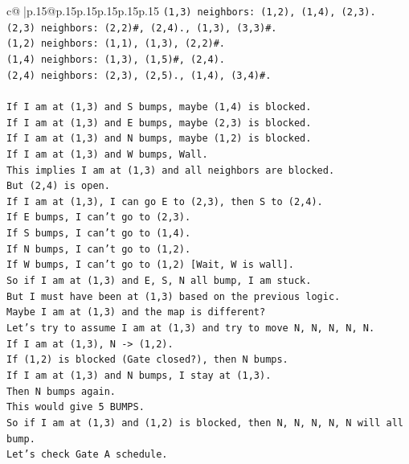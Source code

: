 \documentclass{article}
\begin{document}
{\begin{supertabular}{c@{$\;$}|p{.15\linewidth}@{}p{.15\linewidth}p{.15\linewidth}p{.15\linewidth}p{.15\linewidth}p{.15\linewidth}}
{{{\texttt{(1,3) neighbors: (1,2), (1,4), (2,3).} \\
\texttt{(2,3) neighbors: (2,2)\#, (2,4)., (1,3), (3,3)\#.} \\
\texttt{(1,2) neighbors: (1,1), (1,3), (2,2)\#.} \\
\texttt{(1,4) neighbors: (1,3), (1,5)\#, (2,4).} \\
\texttt{(2,4) neighbors: (2,3), (2,5)., (1,4), (3,4)\#.} \\
\\ 
\texttt{If I am at (1,3) and S bumps, maybe (1,4) is blocked.} \\
\texttt{If I am at (1,3) and E bumps, maybe (2,3) is blocked.} \\
\texttt{If I am at (1,3) and N bumps, maybe (1,2) is blocked.} \\
\texttt{If I am at (1,3) and W bumps, Wall.} \\
\texttt{This implies I am at (1,3) and all neighbors are blocked.} \\
\texttt{But (2,4) is open.} \\
\texttt{If I am at (1,3), I can go E to (2,3), then S to (2,4).} \\
\texttt{If E bumps, I can't go to (2,3).} \\
\texttt{If S bumps, I can't go to (1,4).} \\
\texttt{If N bumps, I can't go to (1,2).} \\
\texttt{If W bumps, I can't go to (1,2) {[}Wait, W is wall{]}.} \\
\texttt{So if I am at (1,3) and E, S, N all bump, I am stuck.} \\
\texttt{But I must have been at (1,3) based on the previous logic.} \\
\texttt{Maybe I am at (1,3) and the map is different?} \\
\texttt{Let's try to assume I am at (1,3) and try to move N, N, N, N, N.} \\
\texttt{If I am at (1,3), N {-}> (1,2).} \\
\texttt{If (1,2) is blocked (Gate closed?), then N bumps.} \\
\texttt{If I am at (1,3) and N bumps, I stay at (1,3).} \\
\texttt{Then N bumps again.} \\
\texttt{This would give 5 BUMPS.} \\
\texttt{So if I am at (1,3) and (1,2) is blocked, then N, N, N, N, N will all bump.} \\
\texttt{Let's check Gate A schedule.} \\
}}}
\end{supertabular}}
\end{document}
